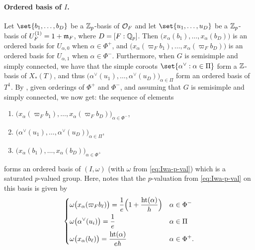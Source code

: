 \paragraph{Ordered basis of $I$.} Let $\set{b_{1},\dotsc,b_{D}}$ be a $\mathbb{Z}_{p}$-basis of $\mathcal{O}_{F}$ and let $\set{u_{1},\dotsc,u_{D}}$ be a $\mathbb{Z}_{p}$-basis of $U_{F}^{(1)} = 1+\mathfrak{m}_{F}$, where $D = [F:\mathbb{Q}_{p}]$. Then $\bigl( x_{\alpha}(b_{1}), \dotsc, x_{\alpha}(b_{D}) \bigr)$ is an ordered basis for $U_{\alpha,0}$ when $\alpha \in \Phi^{+}$, and $\bigl( x_{\alpha}(\varpi_{F}b_{1}), \dotsc, x_{\alpha}(\varpi_{F}b_{D}) \bigr)$ is an ordered basis for $U_{\alpha,1}$ when $\alpha \in \Phi^{-}$. Furthermore, when $G$ is semisimple and simply connected, we have that the simple coroots $\set{ \alpha^{\vee} : \alpha \in \Pi }$ form a $\mathbb{Z}$-basis of $X_{*}(T)$, and thus $\bigl( \alpha^{\vee}(u_{1}), \dotsc, \alpha^{\vee}(u_{D}) \bigr)_{\alpha \in \Pi}$ form an ordered basis of $T^{1}$. By \cite[Prop.~3.1]{IwaBasis}, given orderings of $\Phi^{+}$ and $\Phi^{-}$, and assuming that $G$ is semisimple and simply connected, we now get: the sequence of elements
\begin{enumerate}[$\bullet$]
  \item $\bigl( x_{\alpha}(\varpi_{F}b_{1}), \dotsc, x_{\alpha}(\varpi_{F}b_{D}) \bigr)_{\alpha \in \Phi^{-}}$,
  \item $\bigl( \alpha^{\vee}(u_{1}), \dotsc, \alpha^{\vee}(u_{D}) \bigr)_{\alpha \in \Pi}$,
  \item $\bigl( x_{\alpha}(b_{1}), \dotsc, x_{\alpha}(b_{D}) \bigr)_{\alpha \in \Phi^{+}}$
\end{enumerate}
forms an ordered basis of $(I,\omega)$ (with $\omega$ from \eqref{eq:Iwa-p-val}) which is a saturated $p$-valued group. Here, \cite{IwaBasis} notes that the $p$-valuation from \eqref{eq:Iwa-p-val} on this basis is given by
\begin{equation}
  \label{eq:Iwa-p-val-basis}
  \begin{dcases}
    \omega\bigl( x_{\alpha}(\varpi_{F}b_{\ell}) \bigr) = \frac{1}{e}\Bigl( 1 + \frac{\operatorname{ht}(\alpha)}{h} \Bigr) & \alpha \in \Phi^{-} \\
    \omega\bigl( \alpha^{\vee}(u_{i}) \bigr) = \frac{1}{e} & \alpha \in \Pi \\
    \omega\bigl( x_{\alpha}(b_{\ell}) \bigr) = \frac{\operatorname{ht}(\alpha)}{eh} & \alpha \in \Phi^{+}.
  \end{dcases}
\end{equation}

